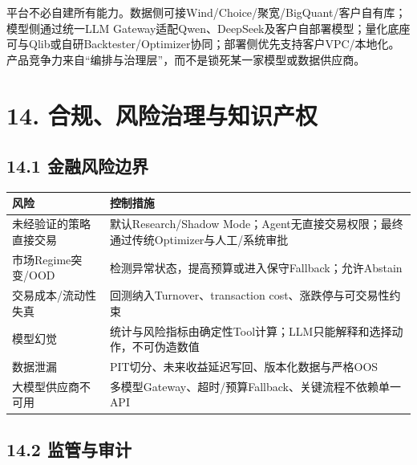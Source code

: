 \documentclass[12pt,a4paper]{ctexart}
\begin{document}
平台不必自建所有能力。数据侧可接Wind/Choice/聚宽/BigQuant/客户自有库；模型侧通过统一LLM
Gateway适配Qwen、DeepSeek及客户自部署模型；量化底座可与Qlib或自研Backtester/Optimizer协同；部署侧优先支持客户VPC/本地化。产品竞争力来自``编排与治理层''，而不是锁死某一家模型或数据供应商。

\section{\texorpdfstring{\textbf{14.
合规、风险治理与知识产权}}{14. 合规、风险治理与知识产权}}\label{ux5408ux89c4ux98ceux9669ux6cbbux7406ux4e0eux77e5ux8bc6ux4ea7ux6743}

\subsection{\texorpdfstring{\textbf{14.1
金融风险边界}}{14.1 金融风险边界}}\label{ux91d1ux878dux98ceux9669ux8fb9ux754c}

\begin{longtable}[]{@{}
  >{\raggedright\arraybackslash}p{}
  >{\raggedright\arraybackslash}p{}@{}}
\toprule\noalign{}
\begin{minipage}[b]{\linewidth}\centering
\textbf{风险}
\end{minipage} & \begin{minipage}[b]{\linewidth}\centering
\textbf{控制措施}
\end{minipage} \\
\midrule\noalign{}
\endhead
\bottomrule\noalign{}
\endlastfoot
未经验证的策略直接交易 & 默认Research/Shadow
Mode；Agent无直接交易权限；最终通过传统Optimizer与人工/系统审批 \\
市场Regime突变/OOD &
检测异常状态，提高预算或进入保守Fallback；允许Abstain \\
交易成本/流动性失真 & 回测纳入Turnover、transaction
cost、涨跌停与可交易性约束 \\
模型幻觉 &
统计与风险指标由确定性Tool计算；LLM只能解释和选择动作，不可伪造数值 \\
数据泄漏 & PIT切分、未来收益延迟写回、版本化数据与严格OOS \\
大模型供应商不可用 &
多模型Gateway、超时/预算Fallback、关键流程不依赖单一API \\
\end{longtable}

\subsection{\texorpdfstring{\textbf{14.2
监管与审计}}{14.2 监管与审计}}\label{ux76d1ux7ba1ux4e0eux5ba1ux8ba1}
\end{document}
